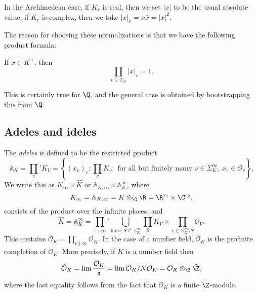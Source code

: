 \documentclass[a4paper]{article}
\newcommand\A{\mathbb{A}}
\begin{document}
In the Archimedean case, if $K_v$ is real, then we set $|x|$ to be the usual absolute value; if $K_v$ is complex, then we take $|x|_v = x\bar{x} = |x|^2$.

The reason for choosing these normalizations is that we have the following product formula:
\begin{prop}
  If $x \in K^\times$, then
  \[
    \prod_{v \in \Sigma_K} |x|_v = 1.
  \]
\end{prop}
This is certainly true for $\Q$, and the general case is obtained by bootstrapping this from $\Q$.

\subsection{Adeles and ideles}
\begin{defi}[Adele]
  The \emph{adeles} is defined to be the restricted product
  \[
    \A_K = \prod_v' K_V = \left\{ (x_v)_v : \prod_v K_v : \text{ for all but finitely many $v \in \Sigma_K^\infty$, $x_v \in \mathcal{O}_v$}\right\}.
  \]
  We write this as $K_\infty \times \hat{K}$ or $\A_{K, \infty} \times \A_K^\infty$, where
  \[
    K_\infty = \A_{K, \infty} = K\otimes_\Q \R = \R^{r_1} \times \C^{r_2}.
  \]
  consists of the product over the infinite places, and
  \[
    \hat{K} = \A_K^\infty = \prod_{v \nmid \infty}' \bigcup_{\text{finite }S \subseteq \Sigma_K^\infty} \prod_S K_V \times \prod_{v \in \Sigma_K^\infty \setminus S} \mathcal{O}_V.
  \]
  This contains $\hat{\mathcal{O}}_K = \prod_{v \nmid \infty} \mathcal{O}_K$. In the case of a number field, $\hat{\mathcal{O}}_K$ is the profinite completion of $\mathcal{O}_K$. More precisely, if $K$ is a number field then
  \[
    \hat{\mathcal{O}}_K = \lim \frac{\mathcal{O}_K}{\mathfrak{a}} = \lim \mathcal{O}_K/N\mathcal{O}_K = \mathcal{O}_K \otimes_\Z \hat{\Z},
  \]
  where the last equality follows from the fact that $\mathcal{O}_K$ is a finite $\Z$-module.
\end{defi}
\end{document}
